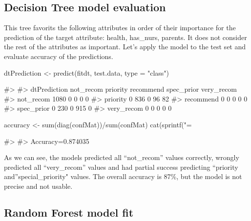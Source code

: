 \hypertarget{decision-tree-model-evaluation}{%
\subsection{Decision Tree model
evaluation}\label{decision-tree-model-evaluation}}

This tree favorits the following attributes in order of their importance
for the prediction of the target attribute: health, has\_nurs, parents.
It does not consider the rest of the attributes as important. Let's
apply the model to the test set and evaluate accuracy of the
predictions.

\begin{Schunk}
\begin{Sinput}
dtPrediction <- predict(fitdt, test.data, type = "class")
\end{Sinput}
\end{Schunk}

\begin{Schunk}
\begin{Soutput}
#>             
#> dtPrediction not_recom priority recommend spec_prior very_recom
#>   not_recom       1080        0         0          0          0
#>   priority           0      836         0         96         82
#>   recommend          0        0         0          0          0
#>   spec_prior         0      230         0        915          0
#>   very_recom         0        0         0          0          0
\end{Soutput}
\begin{Sinput}
accuracy <- sum(diag(confMat))/sum(confMat)
cat(sprintf("\nAccuracy=%f", accuracy))
\end{Sinput}
\begin{Soutput}
#> 
#> Accuracy=0.874035
\end{Soutput}
\end{Schunk}

As we can see, the models predicted all ``not\_recom'' values correctly,
wrongly predicted all ``very\_recom'' values and had partial success
predicting ``priority and''special\_priority" values. The overall
accuracy is 87\%, but the model is not precise and not usable.

\hypertarget{random-forest-model-fit}{%
\subsection{Random Forest model fit}\label{random-forest-model-fit}}

